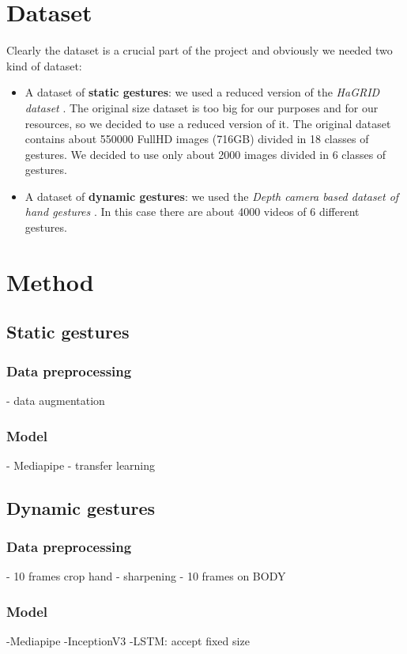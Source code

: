 \documentclass[10pt,twocolumn,letterpaper]{article}
\begin{document}
\section{Dataset}
Clearly the dataset is a crucial part of the project and obviously we needed two kind of dataset:
\begin{itemize}
   \item A dataset of \textbf{static gestures}: we used a reduced version of the \textit{HaGRID dataset} \cite{Alexander_2024}. The original size dataset
   is too big for our purposes and for our resources, so we decided to use a reduced version of it. The original dataset contains about 550000 FullHD images (716GB)
   divided in 18 classes of gestures. We decided to use only about 2000 images divided in 6 classes of gestures.
   \item A dataset of \textbf{dynamic gestures}: we used the \textit{Depth camera based dataset of hand gestures} \cite{JEERU2022108659}. In this case there are about 4000 videos of 
   6 different gestures.
\end{itemize}

\section{Method}
\subsection{Static gestures}
\subsubsection{Data preprocessing}
- data augmentation
\subsubsection{Model}
- Mediapipe
- transfer learning
\subsection{Dynamic gestures}
\subsubsection{Data preprocessing}
- 10 frames crop hand
- sharpening
- 10 frames on BODY
\subsubsection{Model}
-Mediapipe
-InceptionV3
-LSTM: accept fixed size
\end{document}
